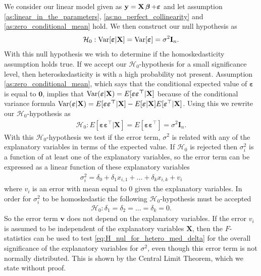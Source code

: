 We consider our linear model given as $\textbf{y} = \textbf{X} \operatorname{\boldsymbol{\beta}} + \boldsymbol{\varepsilon}$ and let assumption \ref{as:linear_in_the_parameters}, \ref{as:no_perfect_collinearity} and \ref{as:zero_conditional_mean} hold. We then construct our null hypothesis as
\begin{align*}
    \mathcal{H}_0 : \operatorname{\text{Var}}[\boldsymbol{\varepsilon} | \mathbf{X}] = \operatorname{\text{Var}}[\boldsymbol{\varepsilon}] = \sigma^2 \textbf{I}_n. 
\end{align*}
With this null hypothesis we wish to determine if the homoskedasticity assumption holds true. 
If we accept our $\mathcal{H}_0$-hypothesis for a small significance level, then heteroskedasticity is with a high probability not present.
Assumption \ref{as:zero_conditional_mean}, which says that the conditional expected value of $\boldsymbol{\varepsilon}$ is equal to $\textbf{0}$, implies that $\operatorname{\text{Var}}(\boldsymbol{\varepsilon} | \mathbf{X}) = E[\boldsymbol{\varepsilon \varepsilon^\top} | \mathbf{X}]$ because of the conditional variance formula $\operatorname{\text{Var}}(\boldsymbol{\varepsilon} | \mathbf{X}) = E[\boldsymbol{\varepsilon \varepsilon^\top} | \mathbf{X}] - E[\boldsymbol{\varepsilon} | \mathbf{X}]E[\boldsymbol{\varepsilon}^\top | \mathbf{X}]$. 
Using this we rewrite our $\mathcal{H}_0$-hypothesis as
\begin{align*}
    \mathcal{H}_0 : E[\boldsymbol{\varepsilon \varepsilon^\top} | \mathbf{X}] = E[\boldsymbol{\varepsilon \varepsilon^\top}] = \sigma^2\textbf{I}_n.
\end{align*}
With this $\mathcal{H}_0$-hypothesis we test if the error term, $\sigma^2$ is related with any of the explanatory variables in terms of the expected value.  
If $\mathcal{H}_0$ is rejected then $\sigma^2_i$ is a function of at least one of the explanatory variables, so the error term can be expressed as a linear function of these explanatory variables
\begin{align}\label{eq:test_hetero_nul_hypotese}
    \sigma_i^2 = \delta_0 + \delta_1x_{i,1} + \ldots + \delta_kx_{i,k} + v_i
\end{align}
where $v_i$ is an error with mean equal to $0$ given the explanatory variables. In order for $\sigma_i^2$ to be homoskedastic the following $\mathcal{H}_0$-hypothesis must be accepted 
\begin{align}\label{eq:H_nul_for_hetero_med_delta}
    \mathcal{H}_0 : \delta_1 = \delta_2 = \ldots = \delta_k = 0.
\end{align}
So the error term $\textbf{v}$ does not depend on the explanatory variables. 
If the error $v_i$ is assumed to be independent of the explanatory variables $\mathbf{X}$, then the $F$-statistics can be used to test \eqref{eq:H_nul_for_hetero_med_delta} for the overall significance of the explanatory variables for $\sigma^2$, even though this error term is not normally distributed. This is shown by the Central Limit Theorem, which we state without proof. 
